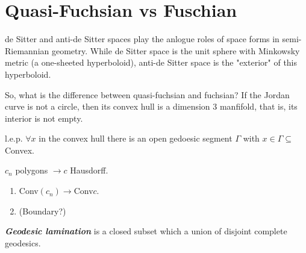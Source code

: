 \section{Quasi-Fuchsian vs Fuschian}

\begin{remark}\leavevmode
	de Sitter and anti-de Sitter spaces play the anlogue roles of space forms in semi-Riemannian geometry. While de Sitter space is the unit sphere with Minkowsky metric (a one-sheeted hyperboloid), anti-de Sitter space is the "exterior" of this hyperboloid.
\end{remark}

So, what is the difference between quasi-fuchsian and fuchsian? If the Jordan curve is not a circle, then its convex hull is a dimension 3 manfifold, that is, its interior is not empty.

\begin{idea4}{l.e.p.}\leavevmode
	$\forall x$ in the convex hull there is an open gedoesic segment $\Gamma$ with $x\in\Gamma\subseteq$ Convex.
\end{idea4}

\begin{exercise}\leavevmode
	$c_n$ polygons $\longrightarrow c$ Hausdorff.
	\begin{enumerate}
		\item Conv$(c_n)\longrightarrow $Conv$c$.
	
		\item (Boundary?)
	\end{enumerate}
\end{exercise}

\begin{defn}\leavevmode
	\textit{\textbf{Geodesic lamination}} is a closed subset which a union of disjoint complete geodesics.
\end{defn}


